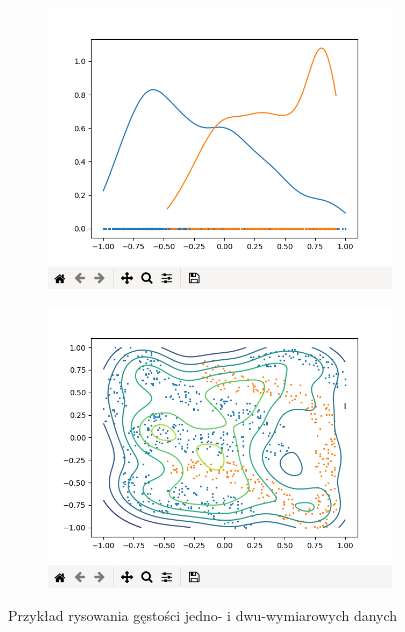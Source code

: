 \documentclass[paper=a4, fontsize=11pt]{scrartcl} %
\numberwithin{equation}{section} %
\numberwithin{figure}{section} %
\begin{document}
    \begin{figure}[H]
        \begin{subfigure}{.5\textwidth}
            \centering
            \includegraphics[width=.95\linewidth]{img/1dplot_density.png}
            \label{fig:1dplot_density}
        \end{subfigure}%
        \begin{subfigure}{.5\textwidth}
            \centering
            \includegraphics[width=.95\linewidth]{img/2dplot_density.png}
            \label{fig:2dplot_density}
        \end{subfigure}
        \caption{Przykład rysowania gęstości jedno- i dwu-wymiarowych danych}
        \label{fig:density_ex}
    \end{figure}
    
\end{document}
